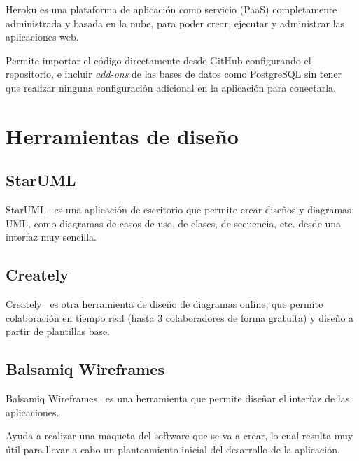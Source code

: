 Heroku es una plataforma de aplicación como servicio (PaaS) completamente administrada y basada en la nube, para poder crear, ejecutar y administrar las aplicaciones web.

Permite importar el código directamente desde GitHub configurando el repositorio, e incluir \textit{add-ons} de las bases de datos como PostgreSQL sin tener que realizar ninguna configuración adicional en la aplicación para conectarla.

\section{Herramientas de diseño}
\subsection{StarUML}
StarUML~\cite{pagina_staruml} es una aplicación de escritorio que permite crear diseños y diagramas UML, como diagramas de casos de uso, de clases, de secuencia, etc. desde una interfaz muy sencilla.

\subsection{Creately}
Creately~\cite{pagina_creately} es otra herramienta de diseño de diagramas online, que permite colaboración en tiempo real (hasta 3 colaboradores de forma gratuita) y diseño a partir de plantillas base.

\subsection{Balsamiq Wireframes}
Balsamiq Wireframes~\cite{pagina_creately} es una herramienta que permite diseñar el interfaz de las aplicaciones. 

Ayuda a realizar una maqueta del software que se va a crear, lo cual resulta muy útil para llevar a cabo un planteamiento inicial del desarrollo de la aplicación.
